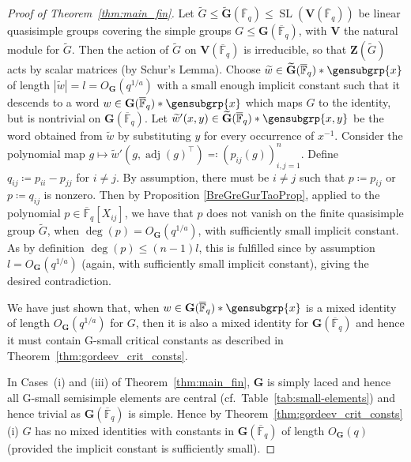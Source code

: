 \documentclass[a4paper,12pt]{amsproc}
\newcommand{\norm}[1]{\left\lvert#1\right\rvert}%
\DeclareMathOperator{\SL}{SL}%
\DeclareMathOperator{\adj}{adj}
\theoremstyle{plain}
\theoremstyle{definition}
\begin{document}
\begin{proof}[Proof of Theorem~\ref{thm:main_fin}]
Let $\widetilde{G}\leq\mathbf{\widetilde{G}}(\overline{\mathbb{F}}_q)\leq\SL(\mathbf{V}(\overline{\mathbb{F}}_q))$ be linear quasisimple groups covering the simple groups $G\leq\mathbf{G}(\overline{\mathbb{F}}_q)$, with $\mathbf{V}$ the natural module for $\widetilde{G}$. 
Then the action of $\widetilde{G}$ on $\mathbf{V}(\overline{\mathbb{F}}_q)$ 
is irreducible, so that $\mathbf{Z}(\widetilde{G})$ acts by scalar matrices (by Schur's Lemma).
Choose $\widetilde{w}\in\mathbf{\widetilde{G}}(\overline{\mathbb{F}}_q)\ast\gensubgrp{x}$ of length $\norm{\widetilde{w}}=l=O_{\mathbf{G}}(q^{1/a})$ with a small enough implicit constant such that it descends to a word $w\in\mathbf{G}(\overline{\mathbb{F}}_q)\ast\gensubgrp{x}$ which maps $G$ to the identity, but is nontrivial on $\mathbf{G}(\overline{\mathbb{F}}_q)$. Let $\widetilde{w}'(x,y)\in\mathbf{\widetilde{G}}(\overline{\mathbb{F}}_q)\ast\gensubgrp{x,y}$ be the word obtained from $\widetilde{w}$ by substituting $y$ for every occurrence of $x^{-1}$. Consider the polynomial map $g\mapsto \widetilde{w}'(g,\adj(g)^\top)\eqqcolon(p_{ij}(g))_{i,j=1}^n$. Define $q_{ij}\coloneqq p_{ii}-p_{jj}$ for $i\neq j$. By assumption, there must be $i\neq j$ such that $p\coloneqq p_{ij}$ or $p\coloneqq q_{ij}$ is nonzero. 
Then by Proposition \ref{BreGreGurTaoProp}, applied to the polynomial $p\in\overline{\mathbb{F}}_q[X_{ij}]$, we have that $p$ does not vanish on the finite quasisimple group $\widetilde{G}$, when $\deg(p)=O_{\mathbf{G}}(q^{1/a})$, with sufficiently small implicit constant. As by definition $\deg(p)\leq (n-1)l$, this is fulfilled since by assumption 
$l=O_{\mathbf{G}}(q^{1/a})$ (again, with sufficiently small implicit constant), 
giving the desired contradiction.

We have just shown that, when $w\in\mathbf{G}(\overline{\mathbb{F}}_q)\ast\gensubgrp{x}$ is a mixed identity of length $O_{\mathbf{G}}(q^{1/a})$ for $G$, then it is also a mixed identity for $\mathbf{G}(\overline{\mathbb{F}}_q)$ and hence it must contain G-small critical constants as described in Theorem~\ref{thm:gordeev_crit_consts}.

In Cases~(i) and (iii) of Theorem~\ref{thm:main_fin}, $\mathbf{G}$ is simply laced and hence all G-small semisimple elements are central (cf.\ Table~\ref{tab:small-elements}) and hence trivial as $\mathbf{G}(\overline{\mathbb{F}}_q)$ is simple. Hence by Theorem~\ref{thm:gordeev_crit_consts}(i) $G$ has no mixed identities with constants in $\mathbf{G}(\overline{\mathbb{F}}_q)$ of length $O_{\mathbf{G}}(q)$ (provided the implicit constant is sufficiently small).


\end{proof}
\end{document}
